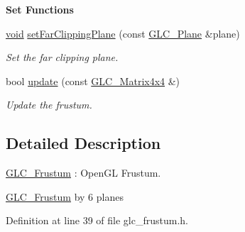 \begin{Indent}{\bf Set Functions}
\begin{DoxyCompactItemize}
\hyperlink{group___u_a_v_objects_plugin_ga444cf2ff3f0ecbe028adce838d373f5c}{void} \hyperlink{class_g_l_c___frustum_a03a68532d4cd7dd2ece75de53299e356}{set\-Far\-Clipping\-Plane} (const \hyperlink{class_g_l_c___plane}{G\-L\-C\-\_\-\-Plane} \&plane)
\begin{DoxyCompactList}\small\item\em Set the far clipping plane. \end{DoxyCompactList}\item 
bool \hyperlink{class_g_l_c___frustum_a7a54557a996d137a0741965326bbc6b1}{update} (const \hyperlink{class_g_l_c___matrix4x4}{G\-L\-C\-\_\-\-Matrix4x4} \&)
\begin{DoxyCompactList}\small\item\em Update the frustum. \end{DoxyCompactList}\end{DoxyCompactItemize}
\end{Indent}


\subsection{Detailed Description}
\hyperlink{class_g_l_c___frustum}{G\-L\-C\-\_\-\-Frustum} \-: Open\-G\-L Frustum. 

\hyperlink{class_g_l_c___frustum}{G\-L\-C\-\_\-\-Frustum} by 6 planes 

Definition at line 39 of file glc\-\_\-frustum.\-h.



